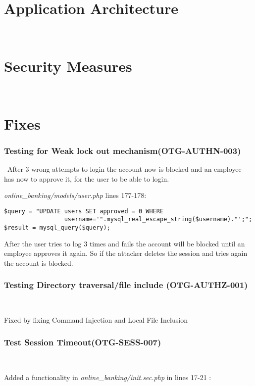 \documentclass[headsepline,footsepline,footinclude=false,oneside,fontsize=11pt,paper=a4,listof=totoc,bibliography=totoc]{scrbook} %
\begin{document}
%

\chapter{Application Architecture} \


\chapter{Security Measures} \

\chapter{Fixes}

\subsection{Testing for Weak lock out mechanism(OTG-AUTHN-003)}\
After 3 wrong attempts to login the account now is blocked and an employee has now to approve it, for the user to be able to login. \

\textit{online\_banking/models/user.php} lines 177-178:\\

\begin{lstlisting} 
$query = "UPDATE users SET approved = 0 WHERE 
                 username='".mysql_real_escape_string($username)."';"; 
$result = mysql_query($query);
\end{lstlisting} 
After the user tries to log 3 times and fails the account will be blocked until an employee approves it again. So if the attacker deletes the session and tries again the account is blocked.\\


\subsection{Testing Directory traversal/file include (OTG-AUTHZ-001)}\

Fixed by fixing Command Injection and Local File Inclusion

\pagebreak
\subsection{Test Session Timeout(OTG-SESS-007)}\

Added a functionality in \textit{online\_banking/init.sec.php} in lines 17-21 :  
\end{document}
